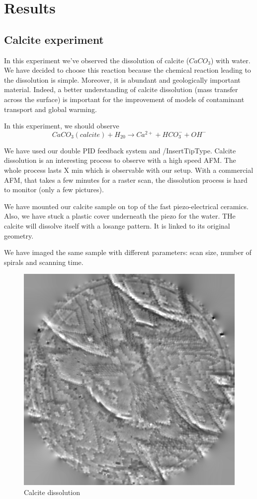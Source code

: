 \chapter{Results}


\section{Calcite experiment}

In this experiment we've observed the dissolution of calcite ($CaCO_3$) with water. We have decided to choose this reaction because the chemical reaction leading to the dissolution is simple. Moreover, it is abundant and geologically important material.\cite{hillner1992atomic} Indeed, a better understanding of calcite dissolution (mass transfer across the surface) is important for the improvement of models of contaminant transport and global warming. \cite{liang1996dissolution}

In this experiment, we should observe \cite{Hillner19921387}
\begin{equation}\label{calcite}
CaCO_3(calcite) + H_20 \rightarrow Ca^{2+} + HCO_3^- + OH^- 
\end{equation}

We have used our double PID feedback system and /InsertTipType. Calcite dissolution is an interesting process to observe with a high speed AFM. The whole process lasts X min which is observable with our setup. With a commercial AFM, that takes a few minutes for a raster scan, the dissolution process is hard to monitor (only a few pictures).

We have mounted our calcite sample on top of the fast piezo-electrical ceramics. Also, we have stuck a plastic cover underneath the piezo for the water. THe calcite will dissolve itself with a losange pattern. It is linked to its original geometry.

We have imaged the same sample with different parameters: scan size, number of spirals and scanning time.

\begin{figure}[H]
  \centering
  \includegraphics[scale=0.5]{images/006_X10s50l10m_MOv2_17.png}
    \caption{Calcite dissolution}
  \label{Calcite dissolution}
\end{figure}

